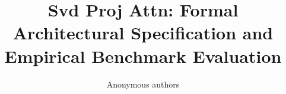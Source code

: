 \title{\textbf{Svd Proj Attn: Formal Architectural Specification and Empirical Benchmark Evaluation}}

\author{Anonymous authors}
